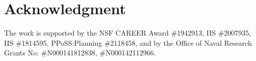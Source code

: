 \documentclass[11pt]{article}
\begin{document}
\vspace{-0.1in}
\section{Acknowledgment}
\vspace{-0.1in}
The work is supported by the NSF CAREER Award \#1942913, IIS \#2007935,
IIS \#1814595, PPoSS:Planning \#2118458, and by the Office of Naval
Research Grants No: \#N000141812838, \#N000142112966.

\vspace{-0.2in}

%

\end{document}
